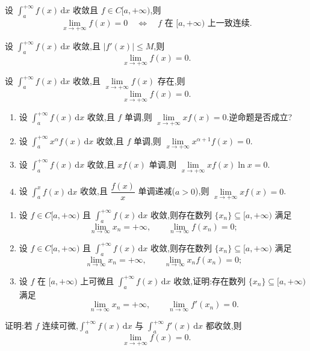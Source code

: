 \documentclass[../../数学分析培优讲义.tex]{subfiles}
\begin{document}
\begin{proposition}[\markstar]
设 $\displaystyle\int_a^{+\infty}f(x)\,\mathrm{d}x$ 收敛且 $f\in C\lbrack a,+\infty)$,则
\[
    \lim\limits_{x\to+\infty}f(x)=0
    \quad\Longleftrightarrow\quad
    f\text{ 在 }\lbrack a,+\infty)\text{ 上一致连续}.
\]
\end{proposition}

\begin{corollary}[\markstar]
设 $\displaystyle\int_a^{+\infty}f(x)\,\mathrm{d}x$ 收敛,且 $|f'(x)|\leq M$,则
\[
    \lim\limits_{x\to+\infty}f(x)=0.
\]
\end{corollary}

\begin{example}
设 $\displaystyle\int_a^{+\infty}f(x)\,\mathrm{d}x$ 收敛,且 $\displaystyle\lim\limits_{x\to+\infty}f(x)$ 存在,则
\[
    \lim\limits_{x\to+\infty}f(x)=0.
\]
\end{example}
\exampleblank

\begin{example}
\begin{enumerate}[label=(\arabic*)]
    \item 设 $\displaystyle\int_a^{+\infty}f(x)\,\mathrm{d}x$ 收敛,且 $f$ 单调,则 $\displaystyle\lim\limits_{x\to+\infty}xf(x)=0$.逆命题是否成立?
    \item 设 $\displaystyle\int_a^{+\infty}x^\alpha f(x)\,\mathrm{d}x$ 收敛,且 $f$ 单调,则 $\displaystyle\lim\limits_{x\to+\infty}x^{\alpha+1}f(x)=0$.
    \item 设 $\displaystyle\int_a^{+\infty}f(x)\,\mathrm{d}x$ 收敛,且 $xf(x)$ 单调,则 $\displaystyle\lim\limits_{x\to+\infty}xf(x)\ln x=0$.
    \item 设 $\displaystyle\int_a^x f(x)\,\mathrm{d}x$ 收敛,且 $\dfrac{f(x)}{x}$ 单调递减($a>0$),则 $\displaystyle\lim\limits_{x\to+\infty}xf(x)=0$.
\end{enumerate}
\end{example}
\exampleblank

\begin{example}
\begin{enumerate}[label=(\arabic*)]
    \item 设 $f\in C\lbrack a,+\infty)$ 且 $\displaystyle\int_a^{+\infty}f(x)\,\mathrm{d}x$ 收敛,则存在数列 $\{x_n\}\subseteq\lbrack a,+\infty)$ 满足
    \[
        \lim\limits_{n\to\infty}x_n=+\infty,
        \qquad
        \lim\limits_{n\to\infty}f(x_n)=0;
    \]
    \item 设 $f\in C\lbrack a,+\infty)$ 且 $\displaystyle\int_a^{+\infty}f(x)\,\mathrm{d}x$ 收敛,则存在数列 $\{x_n\}\subseteq\lbrack a,+\infty)$ 满足
    \[
        \lim\limits_{n\to\infty}x_n=+\infty,
        \qquad
        \lim\limits_{n\to\infty}x_nf(x_n)=0;
    \]
    \item 设 $f$ 在 $\lbrack a,+\infty)$ 上可微且 $\displaystyle\int_a^{+\infty}f(x)\,\mathrm{d}x$ 收敛,证明:存在数列 $\{x_n\}\subseteq\lbrack a,+\infty)$ 满足
    \[
        \lim\limits_{n\to\infty}x_n=+\infty,
        \qquad
        \lim\limits_{n\to\infty}f'(x_n)=0.
    \]
\end{enumerate}
\end{example}
\exampleblank

\begin{example}
证明:若 $f$ 连续可微,$\displaystyle\int_a^{+\infty}f(x)\,\mathrm{d}x$ 与 $\displaystyle\int_a^{+\infty}f'(x)\,\mathrm{d}x$ 都收敛,则
\[
    \lim\limits_{x\to+\infty}f(x)=0.
\]
\end{example}
\exampleblank
\end{document}

